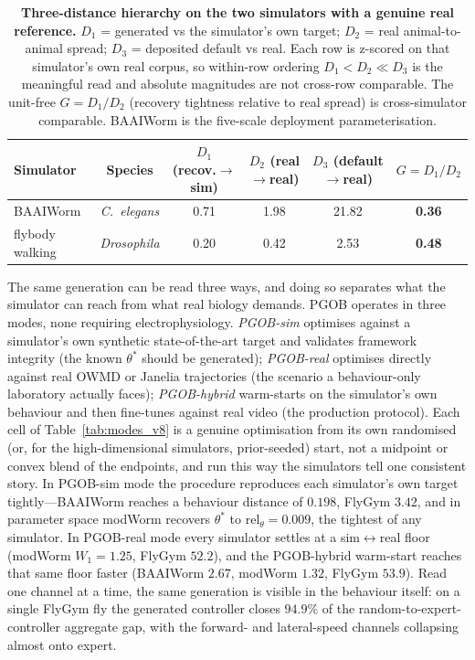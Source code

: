 \documentclass[11pt]{article}
\begin{document}
\begin{table}[h]
\centering\small
\caption{\textbf{Three-distance hierarchy on the two simulators with a genuine real reference.} $D_1$ = generated vs the simulator's own target; $D_2$ = real animal-to-animal spread; $D_3$ = deposited default vs real. Each row is z-scored on that simulator's own real corpus, so within-row ordering $D_1{<}D_2{\ll}D_3$ is the meaningful read and absolute magnitudes are not cross-row comparable. The unit-free $G{=}D_1/D_2$ (recovery tightness relative to real spread) is cross-simulator comparable. BAAIWorm is the five-scale deployment parameterisation.}
\label{tab:hierarchy}
\begin{tabular}{lccccc}\toprule
Simulator & Species & $D_1$ (recov.$\to$sim) & $D_2$ (real$\to$real) & $D_3$ (default$\to$real) & $G{=}D_1/D_2$ \\\midrule
BAAIWorm & \textit{C.~elegans} & 0.71 & 1.98 & 21.82 & \textbf{0.36} \\
flybody walking & \textit{Drosophila} & 0.20 & 0.42 & 2.53 & \textbf{0.48} \\\bottomrule
\end{tabular}
\end{table}

The same generation can be read three ways, and doing so separates what the simulator can reach from what real biology demands. PGOB operates in three modes, none requiring electrophysiology. \emph{PGOB-sim} optimises against a simulator's own synthetic state-of-the-art target and validates framework integrity (the known $\theta^{*}$ should be generated); \emph{PGOB-real} optimises directly against real OWMD or Janelia trajectories (the scenario a behaviour-only laboratory actually faces); \emph{PGOB-hybrid} warm-starts on the simulator's own behaviour and then fine-tunes against real video (the production protocol). Each cell of Table~\ref{tab:modes_v8} is a genuine optimisation from its own randomised (or, for the high-dimensional simulators, prior-seeded) start, not a midpoint or convex blend of the endpoints, and run this way the simulators tell one consistent story. In PGOB-sim mode the procedure reproduces each simulator's own target tightly---BAAIWorm reaches a behaviour distance of $0.198$, FlyGym $3.42$, and in parameter space modWorm recovers $\theta^{*}$ to $\mathrm{rel}_\theta{=}0.009$, the tightest of any simulator. In PGOB-real mode every simulator settles at a sim$\leftrightarrow$real floor (modWorm $W_1{=}1.25$, FlyGym $52.2$), and the PGOB-hybrid warm-start reaches that same floor faster (BAAIWorm $2.67$, modWorm $1.32$, FlyGym $53.9$). Read one channel at a time, the same generation is visible in the behaviour itself: on a single FlyGym fly the generated controller closes $94.9\%$ of the random-to-expert-controller aggregate gap, with the forward- and lateral-speed channels collapsing almost onto expert.
\end{document}
